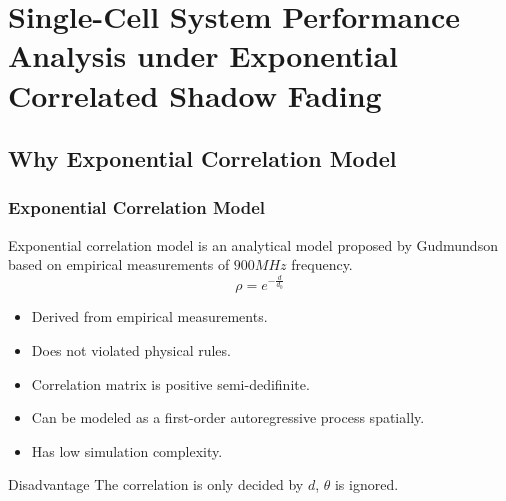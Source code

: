 \documentclass{beamer}
\begin{document}
%
%
\section{Single-Cell System Performance Analysis under Exponential Correlated Shadow Fading}

\subsection{Why Exponential Correlation Model}
\begin{frame}
\frametitle{Exponential Correlation Model}
Exponential correlation model is an analytical model proposed by Gudmundson based on empirical measurements of $900MHz$ frequency.
\begin{equation}
\rho = e^{-\frac{d}{d_{0}}}
\end{equation}
\begin{itemize}
\item Derived from empirical measurements.
\item Does not violated physical rules.
\item Correlation matrix is positive semi-dedifinite.
\item Can be modeled as a first-order autoregressive process spatially.
\item Has low simulation complexity.
\end{itemize}
\begin{block}{Disadvantage}
The correlation is only decided by $d$, $\theta$ is ignored.
\end{block}
\end{frame}
\end{document}
